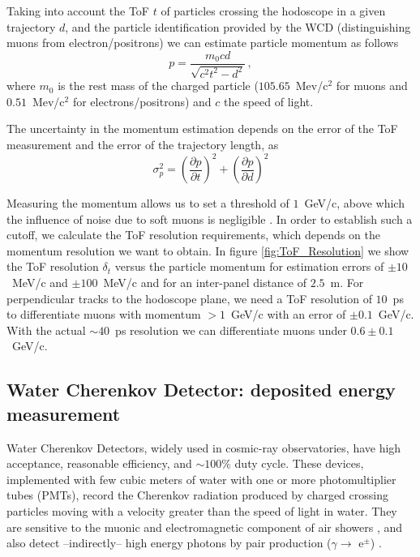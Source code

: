 \documentclass[letterpaper,11pt]{article}
\begin{document}
Taking into account the ToF $t$ of particles crossing the hodoscope in a given trajectory $d$, and the particle identification provided by the WCD (distinguishing muons from electron/positrons) we can estimate particle momentum as follows
\begin{equation}
p = \frac{m_0 c d}{\sqrt{c^2t^2-d^2}} \, ,
\end{equation}
where $m_0$ is the rest mass of the charged particle ($ 105.65$~Mev/c$^2$ for muons and $0.51$~Mev/c$^2$ for electrons/positrons) and $c$ the speed of light. 

The uncertainty in the momentum estimation depends on the error of the ToF measurement and the error of the trajectory length, as
\begin{equation}
\sigma_p^2 = \left( \frac{\partial p}{\partial t} \right)^2 + \left( \frac{\partial p}{\partial d} \right)^2
\end{equation}

Measuring the momentum allows us to set a threshold of $1$~GeV/c, above which the influence of noise due to soft muons is negligible \cite{nishiyama2016monte, nishiyama2014experimental, Olh2018, Olh2017, ambrosino2015joint}. In order to establish such a cutoff, we calculate the ToF resolution requirements, which depends on the momentum resolution we want to obtain. In figure \ref{fig:ToF_Resolution} we show the ToF resolution $\delta_t$ versus the particle momentum for estimation errors of $\pm 10$~MeV/c and $\pm 100$~MeV/c and for an inter-panel distance of $2.5$~m. For perpendicular tracks to the hodoscope plane, we need a ToF resolution of $10$~ps to differentiate muons with momentum $> 1$~GeV/c with an error of $\pm 0.1$~GeV/c. With the actual $\sim 40$~ps resolution we can differentiate muons under $0.6\pm 0.1$~GeV/c.

\subsection{Water Cherenkov Detector: deposited energy measurement}
Water Cherenkov Detectors, widely used in cosmic-ray observatories, have high acceptance, reasonable efficiency, and $\sim 100\%$ duty cycle. These devices, implemented with few cubic meters of water with one or more photomultiplier tubes (PMTs), record the Cherenkov radiation produced by charged crossing particles moving with a velocity greater than the speed of light in water. They are sensitive to the muonic and electromagnetic component of air showers \cite{Auger2015}, and also detect --indirectly-- high energy photons by pair production ($\gamma \rightarrow$ e$^{\pm}$) \cite{allard2007detecting, allard2008use, allekotte2008surface}. 
\end{document}
